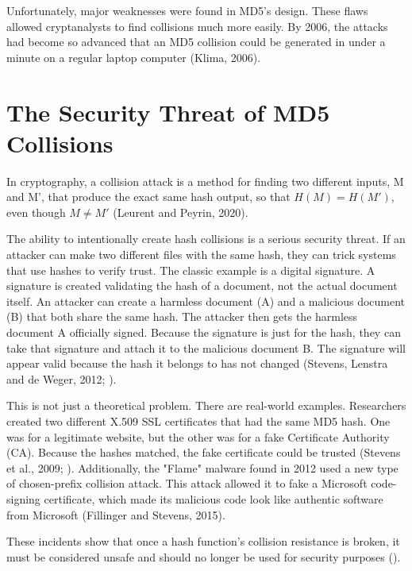 \documentclass[runningheads]{llncs}
\begin{document}
    Unfortunately, major weaknesses were found in MD5’s design. These flaws allowed cryptanalysts to find collisions much more easily. By 2006, the attacks had become so advanced that an MD5 collision could be generated in under a minute on a regular laptop computer (Klima, 2006).


    \section{The Security Threat of MD5 Collisions}

    In cryptography, a collision attack is a method for finding two different inputs, M and M’, that produce the exact same hash output, so that $H(M) = H(M')$, even though $M \neq M'$ (Leurent and Peyrin, 2020).

    The ability to intentionally create hash collisions is a serious security threat. If an attacker can make two different files with the same hash, they can trick systems that use hashes to verify trust. The classic example is a digital signature. A signature is created validating the hash of a document, not the actual document itself. An attacker can create a harmless document (A) and a malicious document (B) that both share the same hash. The attacker then gets the harmless document A officially signed. Because the signature is just for the hash, they can take that signature and attach it to the malicious document B. The signature will appear valid because the hash it belongs to has not changed (Stevens, Lenstra and de Weger, 2012; \cite{microsoft}).

    This is not just a theoretical problem. There are real-world examples. Researchers created two different X.509 SSL certificates that had the same MD5 hash. One was for a legitimate website, but the other was for a fake Certificate Authority (CA). Because the hashes matched, the fake certificate could be trusted (Stevens et al., 2009; \cite{microsoft}). Additionally, the "Flame" malware found in 2012 used a new type of chosen-prefix collision attack. This attack allowed it to fake a Microsoft code-signing certificate, which made its malicious code look like authentic software from Microsoft (Fillinger and Stevens, 2015).

    These incidents show that once a hash function's collision resistance is broken, it must be considered unsafe and should no longer be used for security purposes (\cite{microsoft}).
\end{document}
